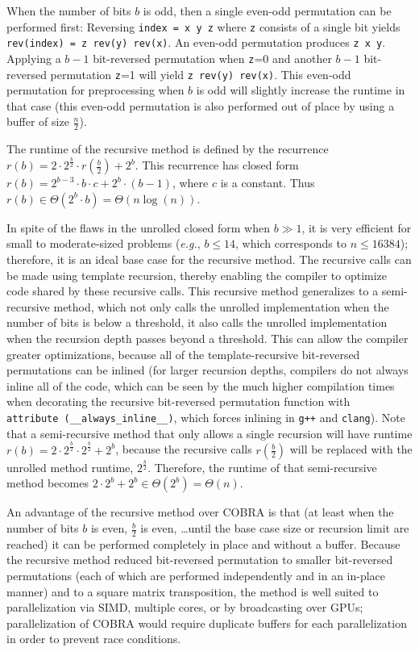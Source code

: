 \documentclass[10pt]{article}
\begin{document}
When the number of bits $b$ is odd, then a single even-odd permutation
can be performed first: Reversing {\tt index = x~y~z} where {\tt z}
consists of a single bit yields {\tt rev(index) = z~rev(y)~rev(x)}. An
even-odd permutation produces {\tt z~x~y}. Applying a $b-1$
bit-reversed permutation when {\tt z}=0 and another $b-1$ bit-reversed
permutation {\tt z}=1 will yield {\tt z~rev(y)~rev(x)}. This even-odd
permutation for preprocessing when $b$ is odd will slightly increase
the runtime in that case (this even-odd permutation is also performed
out of place by using a buffer of size $\frac{n}{2}$).

The runtime of the recursive method is defined by the recurrence $r(b)
= 2 \cdot 2^{\frac{b}{2}} \cdot r(\frac{b}{2}) + 2^b$. This recurrence
has closed form $r(b) = 2^{b-3} \cdot b \cdot c + 2^b \cdot (b-1)$,
where $c$ is a constant. Thus $r(b) \in \Theta(2^b \cdot b) = \Theta(n
\log(n))$.

In spite of the flaws in the unrolled closed form when $b \gg 1$, it
is very efficient for small to moderate-sized problems (\emph{e.g.},
$b \leq 14$, which corresponds to $n \leq 16384$); therefore, it is an
ideal base case for the recursive method. The recursive calls can be
made using template recursion, thereby enabling the compiler to
optimize code shared by these recursive calls. This recursive method
generalizes to a semi-recursive method, which not only calls the
unrolled implementation when the number of bits is below a threshold,
it also calls the unrolled implementation when the recursion depth
passes beyond a threshold. This can allow the compiler greater
optimizations, because all of the template-recursive bit-reversed
permutations can be inlined (for larger recursion depths, compilers do
not always inline all of the code, which can be seen by the much
higher compilation times when decorating the recursive bit-reversed
permutation function with {\tt attribute~(\_\_always\_inline\_\_)},
which forces inlining in {\tt g++} and {\tt clang}). Note that a
semi-recursive method that only allows a single recursion will have
runtime $r(b) = 2 \cdot 2^{\frac{b}{2}} \cdot 2^{\frac{b}{2}} + 2^b$,
because the recursive calls $r(\frac{b}{2})$ will be replaced with the
unrolled method runtime, $2^{\frac{b}{2}}$. Therefore, the runtime of
that semi-recursive method becomes $2\cdot 2^b + 2^b \in \Theta(2^b) =
\Theta(n)$.

An advantage of the recursive method over COBRA is that (at least when
the number of bits $b$ is even, $\frac{b}{2}$ is even, \ldots until
the base case size or recursion limit are reached) it can be performed
completely in place and without a buffer. Because the recursive method
reduced bit-reversed permutation to smaller bit-reversed permutations
(each of which are performed independently and in an in-place manner)
and to a square matrix transposition, the method is well suited to
parallelization via SIMD, multiple cores, or by broadcasting over
GPUs; parallelization of COBRA would require duplicate buffers for
each parallelization in order to prevent race conditions.\newline
\end{document}
